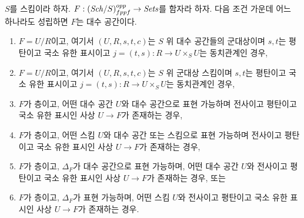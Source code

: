 \begin{theorem}
\label{theorem-final-bootstrap}
$S$를 스킴이라 하자.
$F : (\mathit{Sch}/S)_{fppf}^{opp} \to \textit{Sets}$를 함자라 하자.
다음 조건 가운데 어느 하나라도 성립하면 $F$는 대수 공간이다.
\begin{enumerate}
\item $F = U/R$이고, 여기서 $(U, R, s, t, c)$는 $S$ 위 대수 공간들의
군대상이며 $s, t$는 평탄이고 국소 유한 표시이고
$j = (t, s) : R \to U \times_S U$는 동치관계인 경우,
\item $F = U/R$이고, 여기서 $(U, R, s, t, c)$는 $S$ 위 군대상 스킴이며
$s, t$는 평탄이고 국소 유한 표시이고
$j = (t, s) : R \to U \times_S U$는 동치관계인 경우,
\item $F$가 층이고, 어떤 대수 공간 $U$와 대수 공간으로 표현 가능하며
전사이고 평탄이고 국소 유한 표시인 사상 $U \to F$가 존재하는 경우,
\item $F$가 층이고, 어떤 스킴 $U$와 대수 공간 또는 스킴으로 표현
가능하며 전사이고 평탄이고 국소 유한 표시인 사상 $U \to F$가
존재하는 경우,
\item $F$가 층이고, $\Delta_F$가 대수 공간으로 표현 가능하며,
어떤 대수 공간 $U$와 전사이고 평탄이고 국소 유한 표시인 사상
$U \to F$가 존재하는 경우, 또는
\item $F$가 층이고, $\Delta_F$가 표현 가능하며,
어떤 스킴 $U$와 전사이고 평탄이고 국소 유한 표시인 사상
$U \to F$가 존재하는 경우.
\end{enumerate}
\end{theorem}

